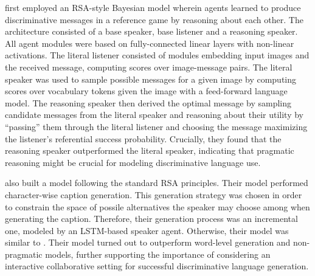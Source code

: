 \cite{andreas2016reasoning}first employed an RSA-style Bayesian model wherein agents learned to produce discriminative messages in a reference game by reasoning about each other. The architecture consisted of a base speaker, base listener and a reasoning speaker. All agent modules were based on fully-connected linear layers with non-linear activations. The literal listener consisted of modules embedding input images and the received message, computing scores over image-message pairs. The literal speaker was used to sample possible messages for a given image by computing scores over vocabulary tokens given the image with a feed-forward language model. The reasoning speaker then derived the optimal message by sampling candidate messages from the literal speaker and reasoning about their utility by ``passing'' them through the literal listener and choosing the message maximizing the listener's referential success probability. 
Crucially, they found that the reasoning speaker outperformed the literal speaker, indicating that pragmatic reasoning might be crucial for modeling discriminative language use. 

\cite{cohn2018pragmatically} also built a model following the standard RSA principles. Their model performed character-wise caption generation. This generation strategy was chosen in order to constrain the space of possile alternatives the speaker may choose among when generating the caption. Therefore, their generation process was an incremental one, modeled by an LSTM-based speaker agent. Otherwise, their model was similar to \cite{andreas2016reasoning}. Their model  turned out to outperform word-level generation and non-pragmatic models, further supporting the importance of considering an interactive collaborative setting for successful discriminative language generation.

